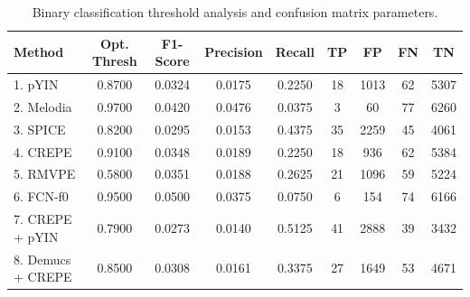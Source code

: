 \begin{table}[h!]
\centering
\caption{Binary classification threshold analysis and confusion matrix parameters.}
\label{tab:ciarp2_table3}
\begin{tabular}{|l|c|c|c|c|c|c|c|c|}
\hline
\textbf{Method} & \textbf{Opt. Thresh} & \textbf{F1-Score} & \textbf{Precision} & \textbf{Recall} & \textbf{TP} & \textbf{FP} & \textbf{FN} & \textbf{TN} \\
\hline
1. pYIN & 0.8700 & 0.0324 & 0.0175 & 0.2250 & 18 & 1013 & 62 & 5307 \\
2. Melodia & 0.9700 & 0.0420 & 0.0476 & 0.0375 & 3 & 60 & 77 & 6260 \\
3. SPICE & 0.8200 & 0.0295 & 0.0153 & 0.4375 & 35 & 2259 & 45 & 4061 \\
4. CREPE & 0.9100 & 0.0348 & 0.0189 & 0.2250 & 18 & 936 & 62 & 5384 \\
5. RMVPE & 0.5800 & 0.0351 & 0.0188 & 0.2625 & 21 & 1096 & 59 & 5224 \\
6. FCN-f0 & 0.9500 & 0.0500 & 0.0375 & 0.0750 & 6 & 154 & 74 & 6166 \\
7. CREPE + pYIN & 0.7900 & 0.0273 & 0.0140 & 0.5125 & 41 & 2888 & 39 & 3432 \\
8. Demucs + CREPE & 0.8500 & 0.0308 & 0.0161 & 0.3375 & 27 & 1649 & 53 & 4671 \\
\hline
\end{tabular}
\end{table}
